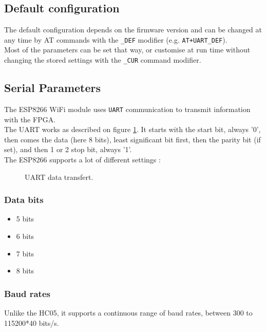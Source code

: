 \documentclass[11pt]{article}
\begin{document}
\subsection{Default configuration}
The default configuration depends on the firmware version and can be changed at any time by AT commands with the \texttt{\_DEF} modifier (e.g. \texttt{AT+UART\_DEF}).\\
Most of the parameters can be set that way, or customise at run time without changing the stored settings with the \texttt{\_CUR} command modifier.
\subsection{Serial Parameters}
The ESP8266 WiFi module uses \texttt{UART} communication to transmit information with the FPGA.\\
The UART works as described on figure \ref{UART_data_transfert}. It starts with the start bit, always '0', then comes the data (here 8 bits), least significant bit first, then the parity bit (if set), and then 1 or 2 stop bit, always '1'.\\
The ESP8266 supports a lot of different settings :
\begin{figure}[H]
        \caption{UART data transfert.}
        \label{UART_data_transfert}
\end{figure}

\subsubsection{Data bits}
\begin{itemize}
    \item 5 bits
    \item 6 bits
    \item 7 bits
    \item 8 bits
\end{itemize}
\subsubsection{Baud rates}
Unlike the HC05, it supports a continuous range of baud rates, between 300 to 115200*40 bits/s.
\end{document}
